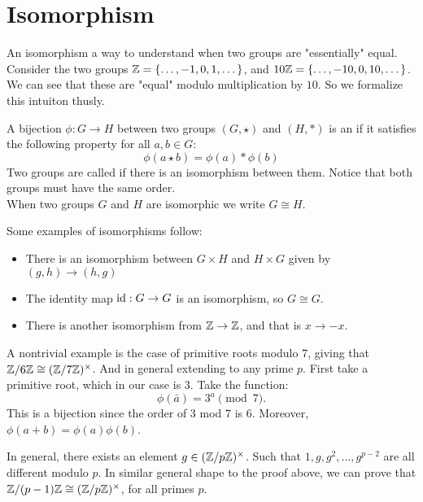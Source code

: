 \documentclass[11pt]{scrreport}
\begin{document}
\section{Isomorphism}
An isomorphism a way to understand when two groups are "essentially" equal.
Consider the two groups $\mathbb Z = \{\dots, -1, 0, 1, \dots\}$, and $10\mathbb Z = \{\dots, -10, 0, 10, \dots\}$. We can see that these are "equal" modulo multiplication by $10$. So we formalize this intuiton thusly.
\begin{definition}
    A bijection $\phi : G\to H$ between two groups $(G, \star)$ and $(H, \ast)$ is an  if it satisfies the following property for all $a,b \in G$:
    \[\phi(a\star b) = \phi(a) \ast \phi(b)\]
    Two groups are called  if there is an isomorphism between them. Notice that both groups must have the same order.\\
    When two groups $G$ and $H$ are isomorphic we write $G\cong H$.
\end{definition}
\begin{example}
    Some examples of isomorphisms follow:
    \begin{itemize}
        \item There is an isomorphism between $G\times H$ and $H\times G$ given by $(g,h)\to (h,g)$
        \item The identity map $\operatorname{id} :G\to G$ is an isomorphism, so $G\cong G$.
        \item There is another isomorphism from $\mathbb Z\to\mathbb Z$, and that is $x\to-x$.
    \end{itemize}
\end{example}
\begin{example}
    A nontrivial example is the case of primitive roots modulo $7$, giving that $\mathbb Z/6\mathbb Z \cong (\mathbb Z/7\mathbb Z)^\times$. And in general extending to any prime $p$. First take a primitive root, which in our case is $3$. Take the function:
    \[\phi(\bar a) = 3^a \pmod 7.\]
    This is a bijection since the order of $3$ mod $7$ is $6$. Moreover, $\phi(a+b) = \phi(a)\phi(b)$.
\end{example}
\begin{example}
    In general, there exists an element $g\in(\mathbb Z/p\mathbb Z)^\times$. Such that $1,g,g^2,\dots,g^{p-2}$ are all different modulo $p$. In similar general shape to the proof above, we can prove that $\mathbb Z/(p-1)\mathbb Z \cong (\mathbb Z/p\mathbb Z)^\times$, for all primes $p$.
\end{example}
\end{document}
